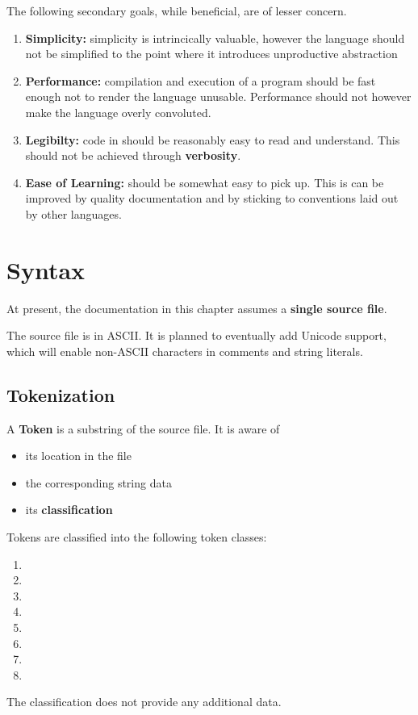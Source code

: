 \documentclass{article}
\begin{document}
\begin{samepage}
    
The following secondary goals, while beneficial, are of lesser concern.
\begin{enumerate}
    \setcounter{enumi}{\therememberEnumi}
    \item {\bf Simplicity:} simplicity is intrincically valuable,
    however the language should not be simplified to the point
    where it introduces unproductive abstraction
    \item {\bf Performance:} compilation and execution of a
    \lazydog program should be fast enough not to render
    the language unusable. Performance should not however
    make the language overly convoluted.
    \item {\bf Legibilty:} code in \lazydog should
    be reasonably easy to read and understand.
    This should not be achieved through {\bf verbosity}.
    \item {\bf Ease of Learning:} \lazydog should be somewhat
    easy to pick up. 
    This is can be improved by quality documentation
    and by sticking to conventions laid out by other languages.
\end{enumerate}
\end{samepage}


\section{Syntax}
At present, the documentation in this chapter assumes
a {\bf single source file}.

The source file is in ASCII. It is planned to eventually add Unicode
support, which will enable non-ASCII characters in comments and string literals.

\subsection{Tokenization}
A {\bf Token} is a substring of the source file.
It is aware of 
\begin{itemize}
    \item its location in the file
    \item the corresponding string data
    \item its {\bf classification}
\end{itemize}

Tokens are classified into the following token classes:
\begin{enumerate}
    \item \tcom
    \item \tident
    \item \ttrait
    \item \tsym
    \item \tint
    \item \tfl
    \item \tstr
    \item \tinv
\end{enumerate}
The classification does not provide any additional data.
\end{document}
